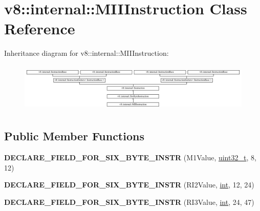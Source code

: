 \hypertarget{classv8_1_1internal_1_1MIIInstruction}{}\section{v8\+:\+:internal\+:\+:M\+I\+I\+Instruction Class Reference}
\label{classv8_1_1internal_1_1MIIInstruction}
Inheritance diagram for v8\+:\+:internal\+:\+:M\+I\+I\+Instruction\+:\begin{figure}[H]
\begin{center}
\leavevmode
\includegraphics[height=2.364865cm]{classv8_1_1internal_1_1MIIInstruction}
\end{center}
\end{figure}
\subsection*{Public Member Functions}
\begin{DoxyCompactItemize}
\item 
\mbox{\label{classv8_1_1internal_1_1MIIInstruction_a17b8ea0bdbf3eb3978f561c90581befd}} 
{\bfseries D\+E\+C\+L\+A\+R\+E\+\_\+\+F\+I\+E\+L\+D\+\_\+\+F\+O\+R\+\_\+\+S\+I\+X\+\_\+\+B\+Y\+T\+E\+\_\+\+I\+N\+S\+TR} (M1\+Value, \mbox{\hyperlink{classuint32__t}{uint32\+\_\+t}}, 8, 12)
\item 
\mbox{\label{classv8_1_1internal_1_1MIIInstruction_ace4ae54a448c75dce63594d68bd2596e}} 
{\bfseries D\+E\+C\+L\+A\+R\+E\+\_\+\+F\+I\+E\+L\+D\+\_\+\+F\+O\+R\+\_\+\+S\+I\+X\+\_\+\+B\+Y\+T\+E\+\_\+\+I\+N\+S\+TR} (R\+I2\+Value, \mbox{\hyperlink{classint}{int}}, 12, 24)
\item 
\mbox{\label{classv8_1_1internal_1_1MIIInstruction_a481174877777f4390de6e8a1f42e068a}} 
{\bfseries D\+E\+C\+L\+A\+R\+E\+\_\+\+F\+I\+E\+L\+D\+\_\+\+F\+O\+R\+\_\+\+S\+I\+X\+\_\+\+B\+Y\+T\+E\+\_\+\+I\+N\+S\+TR} (R\+I3\+Value, \mbox{\hyperlink{classint}{int}}, 24, 47)
\end{DoxyCompactItemize}
